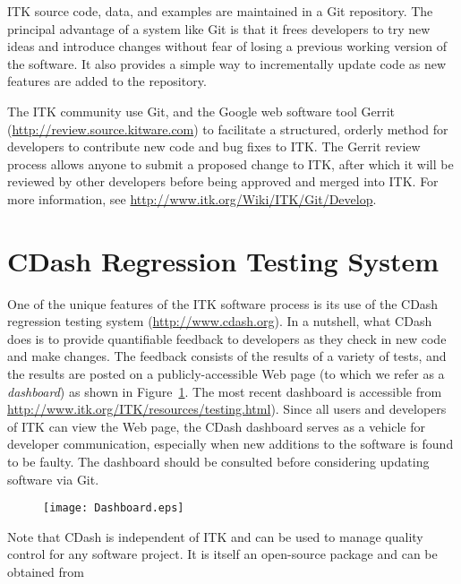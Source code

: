 ITK source code, data, and examples are maintained in a Git repository.  The
principal advantage of a system like Git is that it frees developers to try
new ideas and introduce changes without fear of losing a previous working
version of the software. It also provides a simple way to incrementally
update code as new features are added to the repository.

The ITK community use Git, and the Google web software tool Gerrit
(\url{http://review.source.kitware.com}) to facilitate a structured,
orderly method for developers to contribute new code and bug fixes to
ITK. The Gerrit review process allows anyone to submit a proposed
change to ITK, after which it will be reviewed by other developers
before being approved and merged into ITK.  For more information, see
\url{http://www.itk.org/Wiki/ITK/Git/Develop}.


\section{CDash Regression Testing System}
\label{sec:CDash}
\label{sec:QualityDashboard}


One of the unique features of the ITK software process is its use of the CDash
regression testing system (\url{http://www.cdash.org}). In a
nutshell, what CDash does is to provide quantifiable feedback to developers as
they check in new code and make changes. The feedback consists of the results
of a variety of tests, and the results are posted on a publicly-accessible
Web page (to which we refer as a \emph{dashboard}) as shown in
Figure~\ref{fig:Dashboard}. The most recent dashboard is accessible from
\url{http://www.itk.org/ITK/resources/testing.html}). Since all users and developers of
ITK can view the Web page, the CDash dashboard serves as a vehicle for
developer communication, especially when new additions to the software is
found to be faulty.  The dashboard should be consulted before considering
updating software via Git.


\begin{figure}[ht]
\centering
\texttt{[image: Dashboard.eps]}
\label{fig:Dashboard}
\end{figure}

Note that CDash is independent of ITK and can be used to manage quality
control for any software project. It is itself an open-source package and can
be obtained from

